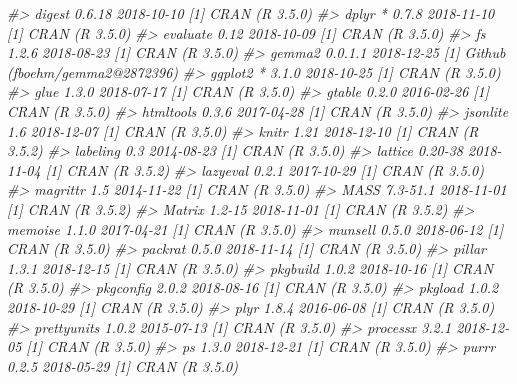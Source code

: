 \documentclass{book}
\newenvironment{Shaded}{\begin{snugshade}}{\end{snugshade}}
\newcommand{\CommentTok}[1]{\textcolor[rgb]{0.56,0.35,0.01}{\textit{#1}}}
\begin{document}
\begin{Shaded}
\begin{Highlighting}[]
\CommentTok{#>  digest        0.6.18     2018-10-10 [1] CRAN (R 3.5.0)                   }
\CommentTok{#>  dplyr       * 0.7.8      2018-11-10 [1] CRAN (R 3.5.0)                   }
\CommentTok{#>  evaluate      0.12       2018-10-09 [1] CRAN (R 3.5.0)                   }
\CommentTok{#>  fs            1.2.6      2018-08-23 [1] CRAN (R 3.5.0)                   }
\CommentTok{#>  gemma2        0.0.1.1    2018-12-25 [1] Github (fboehm/gemma2@2872396)   }
\CommentTok{#>  ggplot2     * 3.1.0      2018-10-25 [1] CRAN (R 3.5.0)                   }
\CommentTok{#>  glue          1.3.0      2018-07-17 [1] CRAN (R 3.5.0)                   }
\CommentTok{#>  gtable        0.2.0      2016-02-26 [1] CRAN (R 3.5.0)                   }
\CommentTok{#>  htmltools     0.3.6      2017-04-28 [1] CRAN (R 3.5.0)                   }
\CommentTok{#>  jsonlite      1.6        2018-12-07 [1] CRAN (R 3.5.0)                   }
\CommentTok{#>  knitr         1.21       2018-12-10 [1] CRAN (R 3.5.2)                   }
\CommentTok{#>  labeling      0.3        2014-08-23 [1] CRAN (R 3.5.0)                   }
\CommentTok{#>  lattice       0.20-38    2018-11-04 [1] CRAN (R 3.5.2)                   }
\CommentTok{#>  lazyeval      0.2.1      2017-10-29 [1] CRAN (R 3.5.0)                   }
\CommentTok{#>  magrittr      1.5        2014-11-22 [1] CRAN (R 3.5.0)                   }
\CommentTok{#>  MASS          7.3-51.1   2018-11-01 [1] CRAN (R 3.5.2)                   }
\CommentTok{#>  Matrix        1.2-15     2018-11-01 [1] CRAN (R 3.5.2)                   }
\CommentTok{#>  memoise       1.1.0      2017-04-21 [1] CRAN (R 3.5.0)                   }
\CommentTok{#>  munsell       0.5.0      2018-06-12 [1] CRAN (R 3.5.0)                   }
\CommentTok{#>  packrat       0.5.0      2018-11-14 [1] CRAN (R 3.5.0)                   }
\CommentTok{#>  pillar        1.3.1      2018-12-15 [1] CRAN (R 3.5.0)                   }
\CommentTok{#>  pkgbuild      1.0.2      2018-10-16 [1] CRAN (R 3.5.0)                   }
\CommentTok{#>  pkgconfig     2.0.2      2018-08-16 [1] CRAN (R 3.5.0)                   }
\CommentTok{#>  pkgload       1.0.2      2018-10-29 [1] CRAN (R 3.5.0)                   }
\CommentTok{#>  plyr          1.8.4      2016-06-08 [1] CRAN (R 3.5.0)                   }
\CommentTok{#>  prettyunits   1.0.2      2015-07-13 [1] CRAN (R 3.5.0)                   }
\CommentTok{#>  processx      3.2.1      2018-12-05 [1] CRAN (R 3.5.0)                   }
\CommentTok{#>  ps            1.3.0      2018-12-21 [1] CRAN (R 3.5.0)                   }
\CommentTok{#>  purrr         0.2.5      2018-05-29 [1] CRAN (R 3.5.0)                   }

\end{Highlighting}
\end{Shaded}
\end{document}

